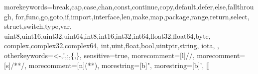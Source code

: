 \setmainfont{Droid Serif}
\setsansfont{Droid Sans}
\setmonofont[SmallCapsFont={DejaVu Sans Mono},Scale=0.70]{DejaVu Sans Mono}
\def\inputGnumericTable{}


\renewcommand*{\bibmark}{\markboth{\bibname}{\bibname}}
\nobibintoc
\renewcommand*{\indexmark}{\markboth{\indexname}{\indexname}}
\noindexintoc
\makeindex


  {morekeywords={break,cap,case,chan,const,continue,copy,default,defer,else,fallthrough,%
  for,func,go,goto,if,import,interface,len,make,map,package,range,return,select,%
  struct,switch,type,var,%
  uint8,uint16,uint32,uint64,int8,int16,int32,int64,float32,float64,byte,%
  complex,complex32,complex64,%
  int,uint,float,bool,uintptr,string,%
  iota,%
  },%
  otherkeywords={<-,!,;,\{,\}},%
    sensitive=true,%
    morecomment=[l]{//},%
    morecomment=[s]{/*}{*/},%
    morecomment=[n]{(*}{*)},%
    morestring=[b]",%
    morestring=[b]',%
  }[]%
\lstset{language=Go,inputencoding=utf8,extendedchars=false,texcl,escapechar=\|,basicstyle=\ttfamily,keywordstyle=\bfseries,numbers=none,numberblanklines=false,showstringspaces=false,breaklines=true,numberstyle=\tiny\ttfamily,xleftmargin=\parindent,xrightmargin=1em,linewidth=0.98\linewidth}

\renewcommand{\lstlistlistingname}{List of Go Code}
\newcommand{\coderemark}[1]{\qquad$\leftarrow \textit{\small #1}$}

\renewcommand{\ExerciseHeaderTitle}{\ExerciseTitle}
\renewcommand{\ExerciseHeaderLabel}{}
\renewcommand{\ExerciseName}{}	%
\renewcommand{\ExerciseHeaderNB}{\theExercise}
\renewcommand{\ExerciseHeader}{\vspace{.7ex}\noindent\textbf{Q\theExercise}. (\number\ExerciseDifficulty) \ExerciseTitle\quad%
\addcontentsline{ex}{exercise}{\numberline{\theExercise}(\number\ExerciseDifficulty) \ExerciseTitle}}
\renewcommand{\AnswerHeader}{\vspace{.7ex}\noindent\textbf{A\theExercise}.  (\number\ExerciseDifficulty) \ExerciseTitle\quad}

